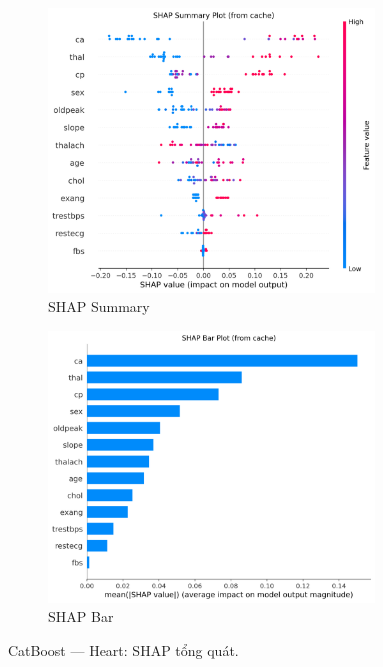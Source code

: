 \begin{figure}[H]
\centering
\begin{subfigure}[b]{0.48\textwidth}
\centering
\includegraphics[width=0.95\textwidth]{Result/heart_dataset/Catboost/SHAP/Summary.png}
\caption{SHAP Summary}
\label{fig:cat_heart_shap_summary}
\end{subfigure}\hfill
\begin{subfigure}[b]{0.48\textwidth}
\centering
\includegraphics[width=0.95\textwidth]{Result/heart_dataset/Catboost/SHAP/Bar.png}
\caption{SHAP Bar}
\label{fig:cat_heart_shap_bar}
\end{subfigure}
\caption{CatBoost — Heart: SHAP tổng quát.}
\label{fig:cat_heart_shap_overview}
\end{figure}

